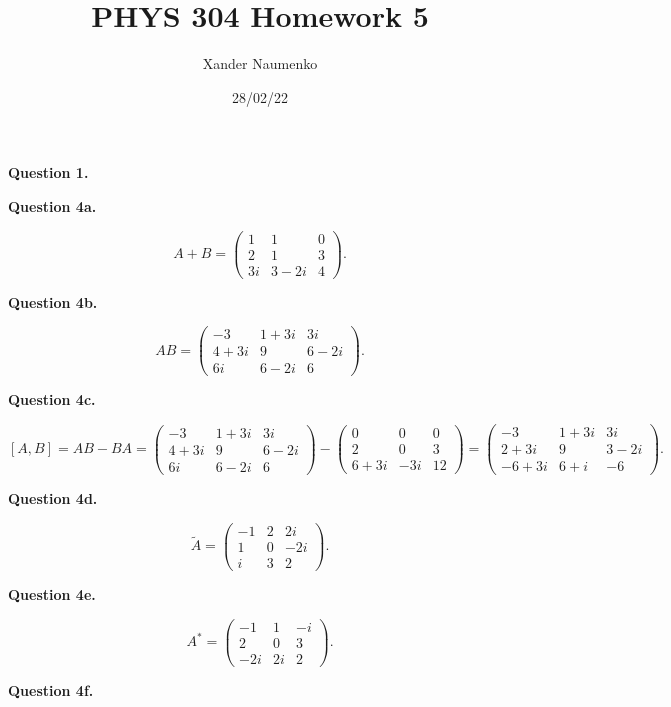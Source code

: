 \documentclass[letterpaper, reqno,11pt]{article}
\begin{document}
\title{PHYS 304 Homework 5}
\date{28/02/22}
\author{Xander Naumenko}
\maketitle

{\noindent\bf Question 1.}  

{\noindent\bf Question 4a.} 

\[
    A+B=\begin{pmatrix} 1&1&0\\2&1&3\\3i&3-2i&4 \end{pmatrix} 
.\]

{\noindent\bf Question 4b.} 

\[
    AB=\begin{pmatrix} -3&1+3i&3i\\4+3i&9&6-2i\\6i&6-2i&6 \end{pmatrix} 
.\]

{\noindent\bf Question 4c.} 

\[
    [A,B]=AB-BA=\begin{pmatrix} -3&1+3i&3i\\4+3i&9&6-2i\\6i&6-2i&6 \end{pmatrix}-\begin{pmatrix} 0&0&0\\2&0&3\\6+3i&-3i&12 \end{pmatrix}=\begin{pmatrix} -3&1+3i&3i\\2+3i&9&3-2i\\-6+3i&6+i&-6 \end{pmatrix} 
.\]

{\noindent\bf Question 4d.} 

\[
    \tilde A=\begin{pmatrix} -1&2&2i\\1&0&-2i\\i&3&2 \end{pmatrix} 
.\]

{\noindent\bf Question 4e.} 

\[
    A^*=\begin{pmatrix} -1&1&-i\\2&0&3\\-2i&2i&2 \end{pmatrix} 
.\]

{\noindent\bf Question 4f.} 
\end{document}
